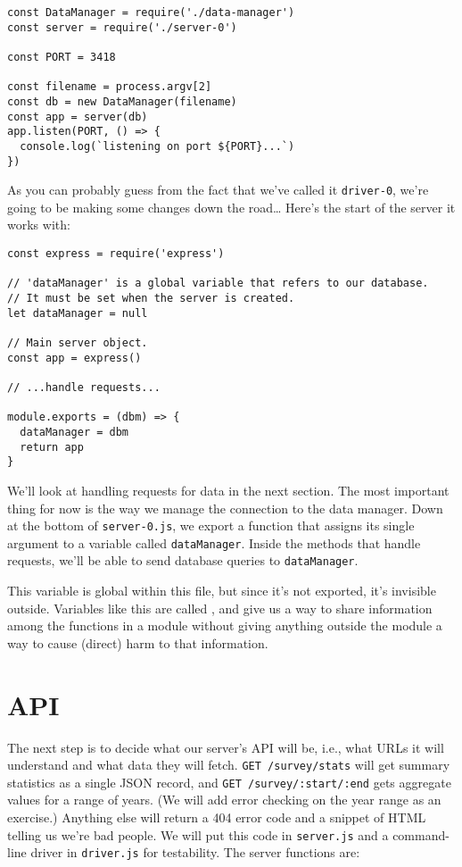 \begin{verbatim}
const DataManager = require('./data-manager')
const server = require('./server-0')

const PORT = 3418

const filename = process.argv[2]
const db = new DataManager(filename)
const app = server(db)
app.listen(PORT, () => {
  console.log(`listening on port ${PORT}...`)
})
\end{verbatim}

\noindent
As you can probably guess from the fact that we've called it \texttt{driver-0},
we're going to be making some changes down the road{\ldots}
Here's the start of the server it works with:

\begin{verbatim}
const express = require('express')

// 'dataManager' is a global variable that refers to our database.
// It must be set when the server is created.
let dataManager = null

// Main server object.
const app = express()

// ...handle requests...

module.exports = (dbm) => {
  dataManager = dbm
  return app
}
\end{verbatim}

We'll look at handling requests for data in the next section.
The most important thing for now is the way we manage the connection to the data manager.
Down at the bottom of \texttt{server-0.js},
we export a function that assigns its single argument to a variable called \texttt{dataManager}.
Inside the methods that handle requests,
we'll be able to send database queries to \texttt{dataManager}.

This variable is global within this file,
but since it's not exported,
it's invisible outside.
Variables like this are called ,
and give us a way to share information among the functions in a module
without giving anything outside the module a way to cause (direct) harm to that information.

\section{API}\label{s:capstone-api}

The next step is to decide what our server's API will be,
i.e.,
what URLs it will understand and what data they will fetch.
\texttt{GET\ /survey/stats} will get summary statistics as a single JSON record,
and \texttt{GET\ /survey/:start/:end} gets aggregate values for a range of years.
(We will add error checking on the year range as an exercise.)
Anything else will return a 404 error code and a snippet of HTML telling us we're bad people.
We will put this code in \texttt{server.js} and a command-line driver in \texttt{driver.js} for testability.
The server functions are:

